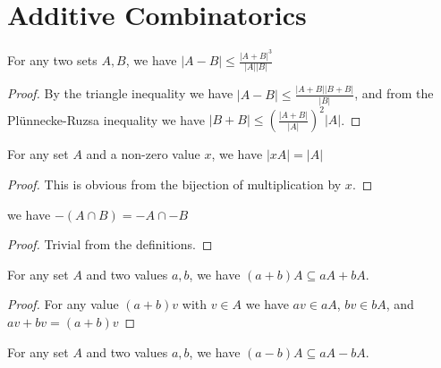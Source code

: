 \chapter{Additive Combinatorics}
\label{chap:ac}

\begin{lemma}
    \label{sub_le_add}
    \leanok
    For any two sets $A, B$, we have $|A-B| \leq \frac{|A+B|^3}{|A||B|}$
\end{lemma}

\begin{proof}
    \leanok
    By the triangle inequality we have $|A-B| \leq \frac{|A+B| |B+B|}{|B|}$, and from
    the Plünnecke-Ruzsa inequality we have $|B+B| \leq (\frac{|A+B|}{|A|})^2 |A|$.
\end{proof}

\begin{lemma}
    \label{card_of_inv}
    \leanok
    For any set $A$ and a non-zero value $x$, we have $|xA| = |A|$
\end{lemma}

\begin{proof}
    \leanok
    This is obvious from the bijection of multiplication by $x$.
\end{proof}

\begin{lemma}
    \label{neg_inter_distrib}
    \leanok
    we have $-(A \cap B) = -A \cap -B$
\end{lemma}

\begin{proof}
    \leanok
    Trivial from the definitions.
\end{proof}

\begin{lemma}
    \label{add_smul_subset_smul_add_smul}
    \leanok
    For any set $A$ and two values $a, b$, we have $(a+b)A \subseteq aA + bA$.
\end{lemma}

\begin{proof}
    \leanok
    For any value $(a+b) v$ with $v \in A$ we have $a v \in a A$, $b v \in b A$, and $a v + b v = (a+b)v$
\end{proof}

\begin{lemma}
    \label{sub_smul_subset_smul_sub_smul}
    \leanok
    For any set $A$ and two values $a, b$, we have $(a-b)A \subseteq aA - bA$.
\end{lemma}

